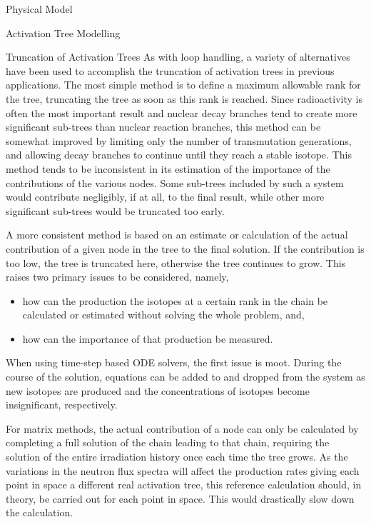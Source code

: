 \begin{chapter}{Physical Model\label{chap:physical}}
\begin{section}{Activation Tree Modelling\label{sec:physical.chains}}
\begin{subsection}{Truncation of Activation Trees}
    As with loop handling, a variety of alternatives have been used to
    accomplish the truncation of activation trees in previous
    applications.  The most simple method is to define a maximum
    allowable rank for the tree, truncating the tree as soon as this
    rank is reached.  Since radioactivity is often the most important
    result and nuclear decay branches tend to create more significant
    sub-trees than nuclear reaction branches, this method can be
    somewhat improved by limiting only the number of transmutation
    generations, and allowing decay branches to continue until they
    reach a stable isotope.  This method tends to be inconsistent in
    its estimation of the importance of the contributions of the
    various nodes.  Some sub-trees included by such a system would
    contribute negligibly, if at all, to the final result, while other
    more significant sub-trees would be truncated too early.
    
    A more consistent method is based on an estimate or calculation of
    the actual contribution of a given node in the tree to the final
    solution.  If the contribution is too low, the tree is truncated
    here, otherwise the tree continues to grow.  This raises two
    primary issues to be considered, namely,
    \begin{itemize}
    \item how can the production the isotopes at a certain rank in the
      chain be calculated or estimated without solving the whole
      problem, and,
    \item how can the importance of that production be measured.
    \end{itemize}
    
    When using time-step based ODE solvers, the first issue is moot.
    During the course of the solution, equations can be added to and
    dropped from the system as new isotopes are produced and the
    concentrations of isotopes become insignificant, respectively.
    
    For matrix methods, the actual contribution of a node can only be
    calculated by completing a full solution of the chain leading to
    that chain, requiring the solution of the entire irradiation
    history once each time the tree grows.  As the variations in the
    neutron flux spectra will affect the production rates giving each
    point in space a different real activation tree, this reference
    calculation should, in theory, be carried out for each point in
    space.  This would drastically slow down the calculation.
    

\end{subsection}
\end{section}
\end{chapter}
